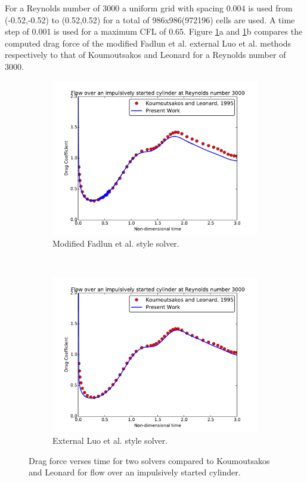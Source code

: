 For a Reynolds number of 3000 a uniform grid with spacing 0.004 is used from (-0.52,-0.52) to (0.52,0.52) for a total of 986x986(972196) cells are used.
A time step of 0.001 is used for a maximum CFL of 0.65.
Figure \ref{fig:cy3000}a and \ref{fig:cy3000}b compares the computed drag force of the modified Fadlun et al. external Luo et al. methods respectively to that of Koumoutsakos and Leonard for a Reynolds number of 3000.
\begin{figure}[!htb]
	\centering
	\begin{subfigure}{0.4\textwidth}
		\includegraphics[width=\linewidth]{cy3000fadlun}
		\caption{Modified Fadlun et al. style solver.}
	\end{subfigure}
	~
	\begin{subfigure}{0.4\textwidth}
		\includegraphics[width=\linewidth]{cy3000luo}
		\caption{External Luo et al. style solver.}
	\end{subfigure}
	\caption{Drag force verses time for two solvers compared to Koumoutsakos and Leonard for flow over an impulsively started cylinder.}
	\label{fig:cy3000}
\end{figure}

